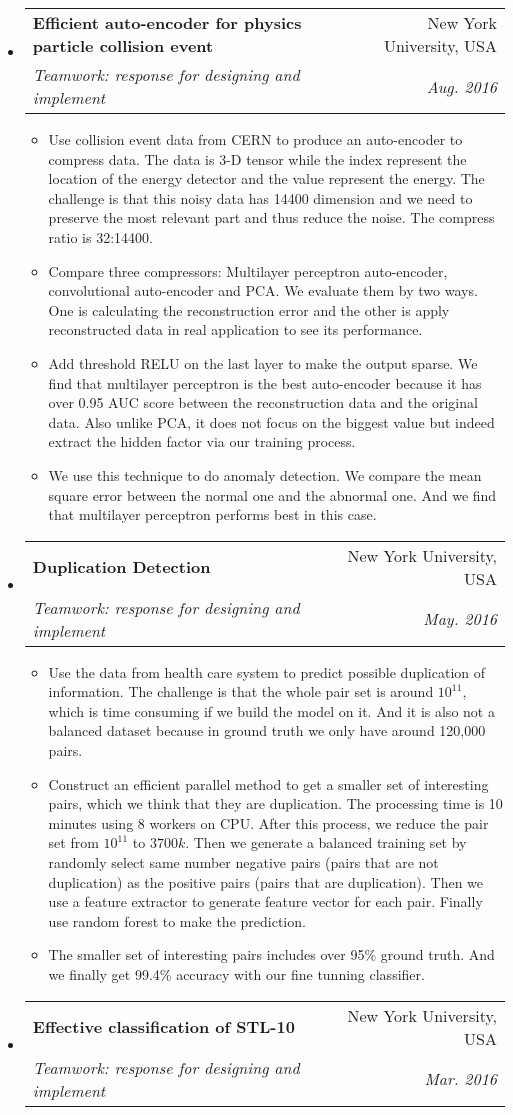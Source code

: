 \documentclass[a4paper,11pt]{article}
\makeatletter
\newcommand{\resitem}[1]{\item #1 \vspace{-2pt}}
\renewcommand{\normalsize}{\fontsize{12pt}{\baselineskip}\selectfont}
\newcommand{\ressubheading}[4]{
	\begin{tabular*}{6.5in}{l@{\extracolsep{\fill}}r}
		\textbf{#1} & #2 \\
		\textit{#3} & \textit{#4} \\
	\end{tabular*}\vspace{-6pt}}
\makeatother
\begin{document}
\begin{itemize}
				\item \ressubheading{{\normalsize Efficient auto-encoder for physics particle collision event}}{New York University, USA}{\normalsize Teamwork: response for designing and implement}{Aug. 2016}
				
				\begin{itemize}
					\resitem{Use collision event data from CERN to produce an auto-encoder to compress data. The data is 3-D tensor while the index represent the location of the energy detector and the value represent the energy. The challenge is that this noisy data has 14400 dimension and we need to preserve the most relevant part and thus reduce the noise. The compress ratio is 32:14400.}
					\resitem{Compare three compressors: Multilayer perceptron auto-encoder, convolutional auto-encoder and PCA. We evaluate them by two ways. One is calculating the reconstruction error and the other is apply reconstructed data in real application to see its performance.}
					\resitem{Add threshold RELU on the last layer to make the output sparse. We find that multilayer perceptron is the best auto-encoder because it has over 0.95 AUC score between the reconstruction data and the original data. Also unlike PCA, it does not focus on the biggest value but indeed extract the hidden factor via our training process.}
					\resitem{We use this technique to do anomaly detection. We compare the mean square error between the normal one and the abnormal one. And we find that multilayer perceptron performs best in this case.}
				\end{itemize}
			\newpage
			\item \ressubheading{\normalsize Duplication Detection}{New York University, USA}{\normalsize Teamwork: response for designing and implement}{May. 2016}
			
			\begin{itemize}
				\resitem{Use the data from health care system to predict possible duplication of information. The challenge is that the whole pair set is around $ 10^{11} $, which is time consuming if we build the model on it. And it is also not a balanced dataset because in ground truth we only have around 120,000 pairs.}
				\resitem{Construct an efficient parallel method to get a smaller set of interesting pairs, which we think that they are duplication. The processing time is 10 minutes using 8 workers on CPU. After this process, we reduce the pair set from $ 10^{11} $ to $ 3700k $. Then we generate a balanced training set by randomly select same number negative pairs (pairs that are not duplication) as the positive pairs (pairs that are duplication). Then we use a feature extractor to generate feature vector for each pair. Finally use random forest to make the prediction.}
				\resitem{The smaller set of interesting pairs includes over 95\% ground truth. And we finally get 99.4\% accuracy with our fine tunning classifier.} 
			\end{itemize}
			\item \ressubheading{{\normalsize Effective classification of STL-10}}{New York University, USA}{\normalsize Teamwork: response for designing and implement}{Mar. 2016}
			

\end{itemize}
\end{document}
